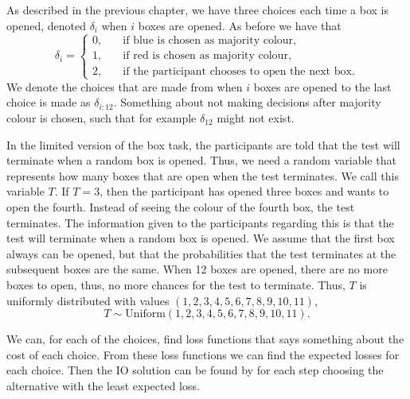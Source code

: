 As described in the previous chapter, we have three choices each time a box is opened, denoted $\delta_i$ when $i$ boxes are opened. As before we have that
\begin{equation}
    \delta_i =
    \begin{cases}
        0,& \quad \text{if blue is chosen as majority colour,}\\
        1,& \quad \text{if red is chosen as majority colour,}\\
        2,& \quad \text{if the participant chooses to open the next box.}
    \end{cases}
\end{equation}
We denote the choices that are made from when $i$ boxes are opened to the last choice is made as $\delta_{i:12}$. Something about not making decisions after majority colour is chosen, such that for example $\delta_{12}$ might not exist. 

In the limited version of the box task, the participants are told that the test will terminate when a random box is opened. Thus, we need a random variable that represents how many boxes that are open when the test terminates. We call this variable $T$. If $T=3$, then the participant has opened three boxes and wants to open the fourth. Instead of seeing the colour of the fourth box, the test terminates. The information given to the participants regarding this is that the test will terminate when a random box is opened. We assume that the first box always can be opened, but that the probabilities that the test terminates at the subsequent boxes are the same. When 12 boxes are opened, there are no more boxes to open, thus, no more chances for the test to terminate. Thus, $T$ is uniformly distributed with values $(1,2,3,4,5,6,7,8,9,10,11)$, 
\begin{equation}
    T \sim \text{Uniform}({1,2,3,4,5,6,7,8,9,10,11}).
\end{equation}






We can, for each of the choices, find loss functions that says something about the cost of each choice. From these loss functions we can find the expected losses for each choice. Then the IO solution can be found by for each step choosing the alternative with the least expected loss. 


